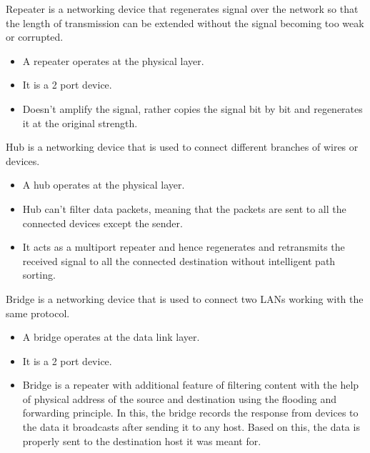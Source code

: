 \documentclass{home_assignment}
\begin{document}
\setcounter{departmentCounter}{0}
\newcommand{\calculateaddress}[1]{
\addtocounter{departmentCounter}{1}
\begin{table}[H]
 \centering
 \begin{tabular}{C{3cm}C{2.5cm}C{2.5cm}C{2.5cm}C{2.5cm}}
\toprule
#1
\bottomrule
 \end{tabular}
 \caption{Calculation for network address and broadcast of subnet \Alph{departmentCounter}}
\end{table}
}
Repeater is a networking device that regenerates signal over the network so that the length of transmission can be extended without the signal becoming too weak or corrupted. 
\begin{itemize}
\item A repeater operates at the physical layer.
\item It is a 2 port device.
\item Doesn't amplify the signal, rather copies the signal bit by bit and regenerates it at the original strength.
\end{itemize}

Hub is a networking device that is used to connect different branches of wires or devices.
\begin{itemize}
\item A hub operates at the physical layer.
\item Hub can't filter data packets, meaning that the packets are sent to all the connected devices except the sender.
\item It acts as a multiport repeater and hence regenerates and retransmits the received signal to all the connected destination without intelligent path sorting. 
\end{itemize}

Bridge is a networking device that is used to connect two LANs working with the same protocol. 
\begin{itemize}
\item A bridge operates at the data link layer.
\item It is a 2 port device.
\item Bridge is a repeater with additional feature of filtering content with the help of physical address of the source and destination using the flooding and forwarding principle. In this, the bridge records the response from devices to the data it broadcasts after sending it to any host. Based on this, the data is properly sent to the destination host it was meant for.
\end{itemize}
\end{document}
